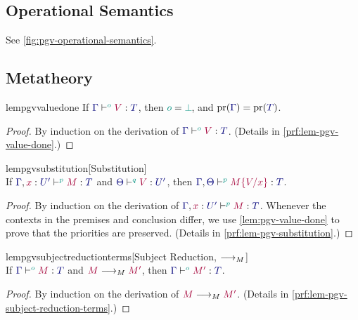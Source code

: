 \documentclass[main.tex]{subfiles}
\begin{document}
\subsection{Operational Semantics}

See \cref{fig:pgv-operational-semantics}.

\subsection{Metatheory}

\begin{restatablelemma}{lempgvvaluedone}
  \label{lem:pgv-value-done}
  If $\tseq[\cs{o}]{\ty{\Gamma}}{V}{T}$, then $\cs{o}=\cs{\pbot}$, and $\pr(\ty{\Gamma})=\pr(\ty{T})$.
\end{restatablelemma}
\begin{proof}
  By induction on the derivation of $\tseq[\cs{o}]{\ty{\Gamma}}{V}{T}$.
  (Details in \cref{prf:lem-pgv-value-done}.)
\end{proof}

\begin{restatablelemma}{lempgvsubstitution}[Substitution]
  \label{lem:pgv-substitution}
  \hfill\\%
  If $\tseq[\cs{p}]{\ty{\Gamma},\tmty{x}{U'}}{M}{T}$ and $\tseq[\cs{q}]{\ty{\Theta}}{V}{U'}$, then $\tseq[\cs{p}]{\ty{\Gamma},\ty{\Theta}}{\subst{M}{V}{x}}{T}$.
\end{restatablelemma}
\begin{proof}
  By induction on the derivation of $\tseq[\cs{p}]{\ty{\Gamma},\tmty{x}{U'}}{M}{T}$. Whenever the contexts in the premises and conclusion differ, we use \cref{lem:pgv-value-done} to prove that the priorities are preserved.
  (Details in \cref{prf:lem-pgv-substitution}.)
\end{proof}

\begin{restatablelemma}{lempgvsubjectreductionterms}[Subject Reduction, $\longrightarrow_{M}$]
  \label{lem:pgv-subject-reduction-terms}
  \hfill\\%
  If $\tseq[\cs{o}]{\ty{\Gamma}}{M}{T}$ and $\tm{M}\tred\tm{M'}$,
  then $\tseq[\cs{o}]{\ty{\Gamma}}{M'}{T}$.
\end{restatablelemma}
\begin{proof}
  By induction on the derivation of $\tm{M}\tred\tm{M'}$.
  (Details in \cref{prf:lem-pgv-subject-reduction-terms}.)
\end{proof}
\end{document}
